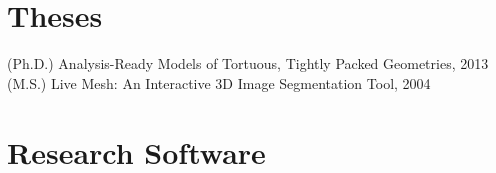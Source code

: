 \documentclass[margin,line]{res}
\begin{document}
\begin{resume}
%
%
%
%
%

\section{\sc Theses}
(Ph.D.) Analysis-Ready Models of Tortuous, Tightly Packed Geometries, 2013\\
(M.S.) Live Mesh: An Interactive 3D Image Segmentation Tool, 2004


\section{\sc Research Software}


\end{resume}
\end{document}
